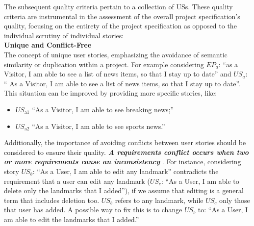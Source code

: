 The subsequent quality criteria pertain to a collection of USs. These quality criteria are instrumental in the assessment of the overall project specification's quality, focusing on the entirety of the project specification as opposed to the individual scrutiny of individual stories: \\ 
\textbf{Unique and Conflict-Free}\\ 
The concept of unique user stories, emphasizing the avoidance of semantic similarity or duplication within a project. For example considering $EP_a$: \enquote{as a Visitor, I am able to see a list of news items, so that I stay up to date} and $US_a$: \enquote{ As a Visitor, I am able to see a list of news items, so that I stay up to date}. This situation can be improved by providing more specific stories, like:
\begin{itemize}
\item $US_{\text{a1}}$ \enquote{As a Visitor, I am able to see breaking news;}
\item $US_{\text{a2}}$ \enquote{As a Visitor, I am able to see sports news.}
\end{itemize}
Additionally, the importance of avoiding conflicts between user stories should be considered to ensure their quality. \textbf{\emph{A requirements conflict occurs when two or more requirements cause an inconsistency}} \cite{paja2013managing} \cite{robinson1989integrating}. For instance, considering story $US_b$: \enquote{As a User, I am able to edit any landmark} contradicts the requirement that a user can edit any landmark ($US_c$: \enquote{As a User, I am able to delete only the landmarks that I added}), if we assume that editing is a general term that includes deletion too. $US_b$ refers to any landmark, while  $US_c$ only those that user has added. A possible way to fix this is to change $US_b$ to: \enquote{As a User, I am able to edit the landmarks that I added.} \cite{lucassen2016improving}

